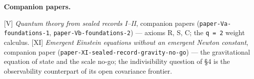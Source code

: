 \documentclass[11pt]{article}
\begin{document}
\textbf{Companion papers.}

[V] \emph{Quantum theory from sealed records I–II}, companion papers (\texttt{paper-Va-foundations-1}, \texttt{paper-Vb-foundations-2}) — axioms R, S, C; the \texttt{q = 2} weight calculus. [XI] \emph{Emergent Einstein equations without an emergent Newton constant}, companion paper (\texttt{paper-XI-sealed-record-gravity-no-go}) — the gravitational equation of state and the scale no-go; the indivisibility question of §4 is the observability counterpart of its open covariance frontier.
\end{document}

